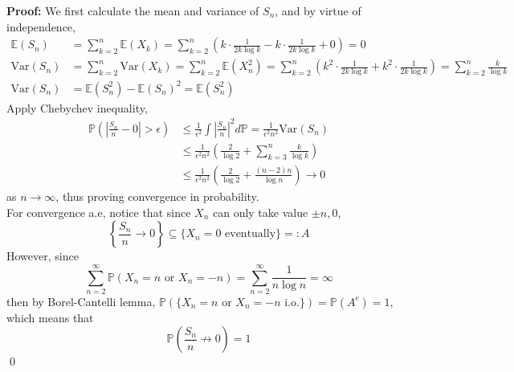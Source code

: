 \documentclass[12pt]{article}
\begin{document}
\textbf{Proof:} We first calculate the mean and variance of $S_n$, and by virtue of independence, 
\begin{align*}
    \mathbb{E}(S_n)&=\sum_{k=2}^n\mathbb{E}(X_k)=\sum_{k=2}^n\left(k\cdot\frac{1}{2k\log k}-k\cdot\frac{1}{2k\log k}+0\right)=0 \\
    \text{Var}(S_n)&=\sum_{k=2}^n\text{Var}(X_k)=\sum_{k=2}^n\mathbb{E}(X_n^2)=\sum_{k=2}^n\left(k^2\cdot\frac{1}{2k\log k}+k^2\cdot\frac{1}{2k\log k}\right)=\sum_{k=2}^n \frac{k}{\log k}\\
    \text{Var}(S_n)&=\mathbb{E}(S_{n}^2)-\mathbb{E}(S_n)^2=\mathbb{E}(S_n^2)
\end{align*}
Apply Chebychev inequality, 
\begin{align*}
    \mathbb{P}\left(\left|\frac{S_n}{n}-0\right|>\epsilon\right)&\leq \frac{1}{\epsilon^2}\int\left|\frac{S_n}{n}\right|^2d\mathbb{P}=\frac{1}{\epsilon^2n^2}\text{Var}(S_n) \\
    &\leq \frac{1}{\epsilon^2n^2}\left(\frac{2}{\log 2}+\sum_{k=3}^{n}\frac{k}{\log k}\right) \\
    &\leq \frac{1}{\epsilon^2n^2}\left(\frac{2}{\log 2}+\frac{(n-2)n}{\log n}\right)\to0
\end{align*}
as $n\to\infty$, thus proving convergence in probability. \\
\indent For convergence a.e, notice that since $X_n$ can only take value $\pm n,0$, 
$$
    \left\{\frac{S_n}{n}\to0\right\}\subseteq\{X_n=0 \text{ eventually}\}=: A
$$
However, since 
$$
    \sum_{n=2}^\infty\mathbb{P}(X_n=n\text{ or } X_n=-n)=\sum_{n=2}^\infty\frac{1}{n\log n}=\infty
$$
then by Borel-Cantelli lemma, $\mathbb{P}(\{X_n=n\text{ or } X_n=-n\text{ i.o.}\})=\mathbb{P}(A^c)=1$, which means that
$$
    \mathbb{P}\left(\frac{S_n}{n}\not\to0\right)=1
$$
\qed
\end{document}
